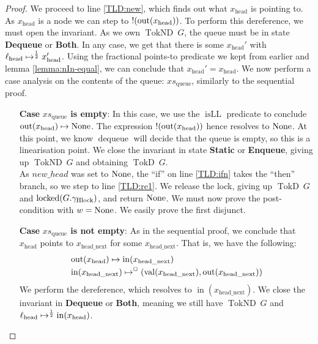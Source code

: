 \documentclass[a4paper, 10pt]{report}
\theoremstyle{definition}
\newcommand{\locked}{\operatorname{locked}}
\newcommand{\dequeue}{\operatorname{dequeue}}
\newcommand{\xsqueue}{xs_{\mathrm{queue}}}
\newcommand{\isLL}{\operatorname{isLL}}
\newcommand{\locN}[1]{\loc_{\mathrm{#1}}}
\newcommand{\lochead}{\locN{head}}
\newcommand{\nodeval}{\valB}
\newcommand{\nIn}[1]{\operatorname{in}(#1)}
\newcommand{\nVal}[1]{\operatorname{val}(#1)}
\newcommand{\nOut}[1]{\operatorname{out}(#1)}
\newcommand{\node}{x}
\newcommand{\nodeN}[1]{\node_{\mathrm{#1}}}
\newcommand{\nodehead}{\nodeN{head}}
\newcommand{\nodeheadnext}{\nodeN{head\_next}}
\newcommand{\StaticState}{\textbf{Static}\xspace}
\newcommand{\EnqueueState}{\textbf{Enqueue}\xspace}
\newcommand{\DequeueState}{\textbf{Dequeue}\xspace}
\newcommand{\BothState}{\textbf{Both}\xspace}
\newcommand{\Qg}{G}
\newcommand{\ghlock}{\gname_{\mathrm{Hlock}}}
\newcommand{\TokD}[1]{\operatorname{TokD} ~ #1}
\newcommand{\TokDQg}{\TokD{\Qg}}
\newcommand{\TokND}[1]{\operatorname{TokND} ~ #1}
\newcommand{\TokNDQg}{\TokND{\Qg}}
\newcommand{\isNode}[1]{\nIn{#1} \mapsto^{\persistently} (\nVal{#1}, \nOut{#1})}
\begin{document}
\begin{proof}
We proceed to line \ref{TLD:new}, which finds out what $\nodehead$ is pointing to. As $\nodehead$ is a node we can step to $\deref (\nOut{\nodehead})$. To perform this dereference, we must open the invariant. As we own $\TokNDQg$, the queue must be in state \DequeueState or \BothState. In any case, we get that there is some $\nodehead'$ with $\lochead \mapsto^{\frac{1}{2}} \nodehead'$. Using the fractional points-to predicate we kept from earlier and lemma \ref{lemma:nIn-equal}, we can conclude that $\nodehead' = \nodehead$. We now perform a case analysis on the contents of the queue: $\xsqueue$, similarly to the sequential proof.
\begin{itemize}
  \item[\textbf{Case}] \textbf{$\xsqueue$ is empty}: 
  In this case, we use the $\isLL$ predicate to conclude $\nOut{\nodehead} \mapsto \None$. The expression $\deref (\nOut{\nodehead})$ hence resolves to $\operatorname{None}$. At this point, we know $\dequeue$ will decide that the queue is empty, so this is a linearisation point. We close the invariant in state \StaticState or \EnqueueState, giving up $\TokNDQg$ and obtaining $\TokDQg$.\\
  As $new\_head$ was set to $\operatorname{None}$, the ``if'' on line \ref{TLD:ifn} takes the ``then'' branch, so we step to line \ref{TLD:re1}. We release the lock, giving up $\TokDQg$ and $\locked(\Qg.\ghlock)$, and return $\operatorname{None}$. We must now prove the post-condition with $\nodeval = \None$. We easily prove the first disjunct.

  \item[\textbf{Case}] \textbf{$\xsqueue$ is not empty}:
  As in the sequential proof, we conclude that $\nodehead$ points to $\nodeheadnext$ for some $\nodeheadnext$. That is, we have the following:
  \begin{align}
    &\nOut{\nodehead} \mapsto \nIn{\nodeheadnext}\label{TLMSQ:spec:conc:proof:deq:headtonext}\\
    &\isNode{\nodeheadnext}\label{TLMSQ:spec:conc:proof:deq:headnextnode}
  \end{align}
  We perform the dereference, which resolves to $\nIn{\nodeheadnext}$. We close the invariant in \DequeueState or \BothState, meaning we still have $\TokNDQg$ and $\lochead \mapsto^{\frac{1}{2}} \nIn{\nodehead}$.


\end{itemize}
\end{proof}
\end{document}
